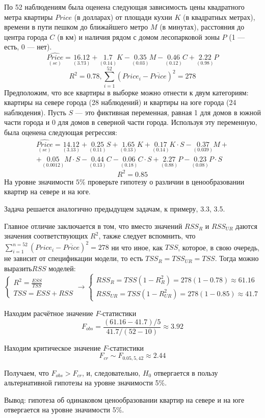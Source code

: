 \begin{problem} %
 По 52 наблюдениям была оценена следующая зависимость цены квадратного метра квартиры $Price$ (в долларах) от площади кухни $K$ (в квадратных метрах), времени в пути пешком до ближайшего метро $M$ (в минутах), расстояния до центра города $C$ (в км) и наличия рядом с домом лесопарковой зоны $P$ (1 — есть, 0 — нет).
\[
\underset{(se)}{\widehat{Price}}=\underset{(3.73)}{16.12}+\underset{(0.14)}{1.7}K-\underset{(0.03)}{0.35}M-\underset{(0.12)}{0.46}C+\underset{(0.98)}{2.22}P
\]
\[
R^2=0.78, \sum_{i=1}^{52} {(Price_i-\overline{Price})^2}=278
\]
Предположим, что все квартиры в выборке можно отнести к двум категориям: квартиры на севере города (28 наблюдений) и квартиры на юге города (24 наблюдения). Пусть
$S$ — это фиктивная переменная, равная 1 для домов в южной части города и 0 для домов в северной части города. Используя эту переменную, была оценена следующая регрессия:
\begin{multline*}
\underset{(se)}{\widehat{Price}} =\underset{(3.13)}{14.12}+\underset{(0.11)}{0.25}S+\underset{(0.13)}{1.65}K+\underset{(0.14)}{0.17}K\cdot{S}-\underset{(0.039)}{0.37}M+\\
+\underset{(0.0012)}{0.05}M\cdot{S}-\underset{(0.13)}{0.44}C-\underset{(0.18)}{0.06}C\cdot{S}+\underset{(0.88)}{2.27}P-\underset{(0.08)}{0.23}P\cdot{S}
\end{multline*}
\[
R^2 = 0.85
\]
На уровне значимости $5\%$ проверьте гипотезу о различии в ценообразовании квартир на севере и на юге.


\begin{sol}
Задача решается аналогично предыдущем задачам, к примеру, 3.3, 3.5.

Главное отличие заключается в том, что вместо значений $RSS_{R}$ и $RSS_{UR}$ даются значения соответствующих $R^2$, также следует вспомнить, что $\sum_{i=1}^{n=52}(Price_i-\overline{Price})^2=278$ ни что иное, как $TSS$, которое, в свою очередь, не зависит от спецификации модели, то есть $TSS_R=TSS_{UR}=TSS$. Тогда можно выразить$RSS$ моделей:
\[
\begin{cases}
R^2=\frac{ESS}{TSS} \\
TSS=ESS+RSS
\end{cases}
\to
\begin{cases}
RSS_R=TSS(1-R^2_R)=278(1-0.78)\approx 61.16\\
RSS_{UR}=TSS(1-R^2_{UR})=278(1-0.85)\approx 41.7
\end{cases}
\]

Находим расчётное значение $F$-статистики
\[
F_{obs}=\frac{(61.16-41.7)/5}{41.7/(52-10)}\approx 3.92
\]

Находим критическое значение $F$-статистики
\[
F_{cr}\sim F_{0.05,5,42}\approx 2.44
\]

Получаем, что $F_{obs}>F_{cr}$, и, следовательно, $H_0$ отвергается в пользу альтернативной гипотезы на уровне значимости 5\%.


Вывод: гипотеза об одинаковом ценообразовании квартир на севере и на юге отвергается на уровне значимости 5\%.
\end{sol}
\end{problem}



